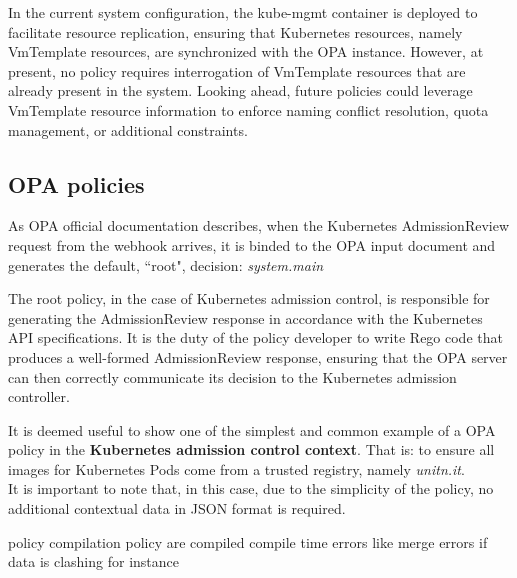 In the current system configuration, the kube-mgmt container is deployed to facilitate resource replication, ensuring that Kubernetes resources, namely VmTemplate resources, are synchronized with the OPA instance. However, at present, no policy requires interrogation of VmTemplate resources that are already present in the system.
Looking ahead, future policies could leverage VmTemplate resource information to enforce naming conflict resolution, quota management, or additional constraints.

\newpage

\subsection{OPA policies}
\label{sec:opa_policies}






As OPA official documentation describes, when the Kubernetes AdmissionReview request from the webhook arrives, it is binded to the OPA input document and generates the default, ``root", decision: \textit{system.main}

The root policy, in the case of Kubernetes admission control, is responsible for generating the AdmissionReview response in accordance with the Kubernetes API specifications. It is the duty of the policy developer to write Rego code that produces a well-formed AdmissionReview response, ensuring that the OPA server can then correctly communicate its decision to the Kubernetes admission controller.

It is deemed useful to show one of the simplest and common example of a OPA policy in the \textbf{Kubernetes admission control context}. That is: to ensure all images for Kubernetes Pods come from a trusted registry, namely \textit{unitn.it}. \\


It is important to note that, in this case, due to the simplicity of the policy, no additional contextual data in JSON format is required.


policy compilation
policy are compiled
compile time errors like merge errors if data is clashing for instance

